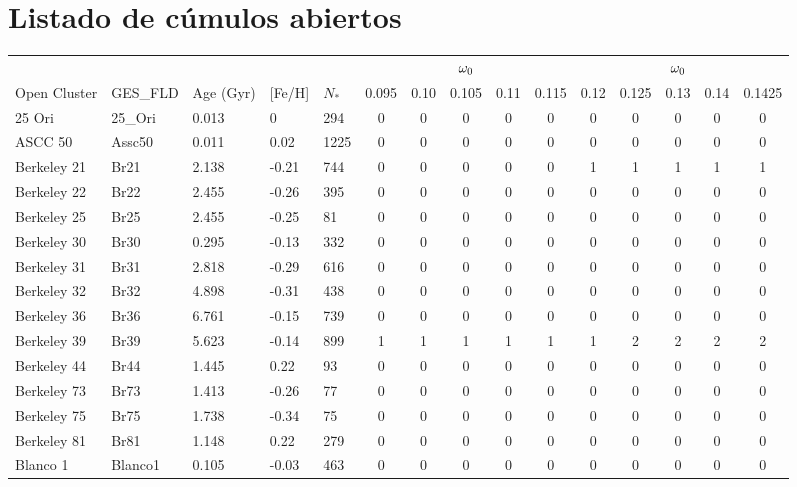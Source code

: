 \newpage
{}
\recalctypearea
\chapter{Listado de cúmulos abiertos}\label{ap:apendice1}

\begin{longtable}[c]{|l l l l l || c c c c c | c c c c c|} 
		\hline
		& & & & & & & $\omega_{\mathrm{0}}$ & & & & & $\omega_{\mathrm{0}}$ & & \\
		Open Cluster & GES\_FLD & Age (Gyr) & [Fe/H] & $N_*$ & 0.095 & 0.10 & 0.105 & 0.11 & 0.115 & 0.12 & 0.125 & 0.13 & 0.14 & 0.1425\\
		\hline
		25 Ori & 25\_Ori & 0.013 & 0 & 294 & 0 & 0 & 0 & 0 & 0 & 0 & 0 & 0 & 0 & 0\\
		ASCC 50 & Assc50 & 0.011 & 0.02 & 1225 & 0 & 0 & 0 & 0 & 0 & 0 & 0 & 0 & 0 & 0\\
		\rowcolor{lightgray}
		Berkeley 21 & Br21 & 2.138 & -0.21 & 744 & 0 & 0 & 0 & 0 & 0 & 1 & 1 & 1 & 1 & 1\\
		Berkeley 22 & Br22 & 2.455 & -0.26 & 395 & 0 & 0 & 0 & 0 & 0 & 0 & 0 & 0 & 0 & 0\\
		Berkeley 25 & Br25 & 2.455 & -0.25 & 81 & 0 & 0 & 0 & 0 & 0 & 0 & 0 & 0 & 0 & 0\\
		Berkeley 30 & Br30 & 0.295 & -0.13 & 332 & 0 & 0 & 0 & 0 & 0 & 0 & 0 & 0 & 0 & 0\\
		Berkeley 31 & Br31 & 2.818 & -0.29 & 616 & 0 & 0 & 0 & 0 & 0 & 0 & 0 & 0 & 0 & 0\\
		Berkeley 32 & Br32 & 4.898 & -0.31 & 438 & 0 & 0 & 0 & 0 & 0 & 0 & 0 & 0 & 0 & 0\\
		Berkeley 36 & Br36 & 6.761 & -0.15 & 739 & 0 & 0 & 0 & 0 & 0 & 0 & 0 & 0 & 0 & 0\\
		\rowcolor{lightgray}
		Berkeley 39 & Br39 & 5.623 & -0.14 & 899 & 1 & 1 & 1 & 1 & 1 & 1 & 2 & 2 & 2 & 2\\
		Berkeley 44 & Br44 & 1.445 & 0.22 & 93 & 0 & 0 & 0 & 0 & 0 & 0 & 0 & 0 & 0 & 0\\
		Berkeley 73 & Br73 & 1.413 & -0.26 & 77 & 0 & 0 & 0 & 0 & 0 & 0 & 0 & 0 & 0 & 0\\
		Berkeley 75 & Br75 & 1.738 & -0.34 & 75 & 0 & 0 & 0 & 0 & 0 & 0 & 0 & 0 & 0 & 0\\
		Berkeley 81 & Br81 & 1.148 & 0.22 & 279 & 0 & 0 & 0 & 0 & 0 & 0 & 0 & 0 & 0 & 0\\
		Blanco 1 & Blanco1 & 0.105 & -0.03 & 463 & 0 & 0 & 0 & 0 & 0 & 0 & 0 & 0 & 0 & 0\\

\end{longtable}
